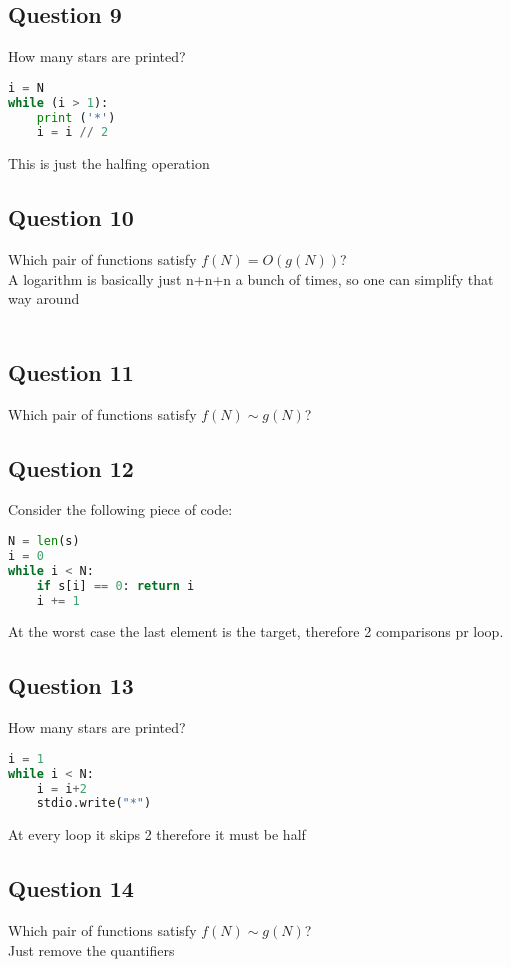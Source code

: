 \subsection{Question 9}
How many stars are printed?
\begin{lstlisting}[language=python]
i = N
while (i > 1):
    print ('*')
    i = i // 2
\end{lstlisting}
This is just the halfing operation\\[1ex]


\subsection{Question 10}
Which pair of functions satisfy $f(N)=O(g(N))$?\\
A logarithm is basically just n+n+n a bunch of times, so one can simplify that way around\\[1ex]
\


\subsection{Question 11}
Which pair of functions satisfy $f(N)\sim g(N)$?\\[1ex]


\subsection{Question 12}
Consider the following piece of code:
\begin{lstlisting}[language=python]
N = len(s)
i = 0
while i < N:
    if s[i] == 0: return i
    i += 1
\end{lstlisting}
At the worst case the last element is the target, therefore 2 comparisons pr loop.\\[1ex]


\subsection{Question 13}
How many stars are printed?
\begin{lstlisting}[language=python]
i = 1
while i < N:
    i = i+2
    stdio.write("*")
\end{lstlisting}
At every loop it skips 2 therefore it must be half\\[1ex]


\subsection{Question 14}
Which pair of functions satisfy $f(N)\sim g(N)$?\\
Just remove the quantifiers\\[1ex]
